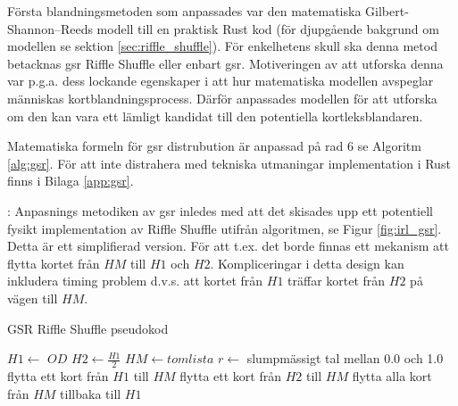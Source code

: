 \documentclass[swedish,a4paper]{article}
\begin{document}
Första blandningsmetoden som anpassades var den matematiska
Gilbert-Shannon–Reeds modell till en praktisk Rust kod (för djupgående bakgrund
om modellen se sektion \ref{sec:riffle_shuffle}). För enkelhetens skull ska denna metod
betacknas \gls{gsr} Riffle Shuffle eller enbart \gls{gsr}. Motiveringen av att
utforska denna var  p.g.a. dess lockande egenskaper i att hur matematiska
modellen avspeglar människas kortblandningsprocess. Därför anpassades modellen för att
utforska om den kan vara ett lämligt kandidat till den potentiella
kortleksblandaren.

Matematiska formeln för \gls{gsr} distrubution är anpassad på rad 6 se Algoritm
\ref{alg:gsr}. För att inte distrahera med tekniska utmaningar implementation i
Rust finns i Bilaga \ref{app:gsr}.

: Anpasnings metodiken av
\gls{gsr} inledes med att det skisades upp ett potentiell fysikt implementation av
Riffle Shuffle utifrån algoritmen, se Figur \ref{fig:irl_gsr}. Detta är ett
simplifierad version. För att t.ex. det borde finnas ett mekanism att flytta
kortet från $HM$ till $H1$ och $H2$. Kompliceringar i detta design kan inkludera
timing problem d.v.s. att kortet från $H1$ träffar kortet från $H2$ på vägen
till $HM$.

\begin{algorithm}
\caption{GSR Riffle Shuffle pseudokod}
\label{alg:gsr}
\begin{algorithmic}[1]
\State $H1 \gets$ $OD$ 
\State $H2 \gets \frac{H1}{2}$ 
\State $HM \gets tom lista$ 
\State $r \gets$ slumpmässigt tal mellan 0.0 och 1.0 
        \State flytta ett kort från $H1$ till $HM$
    \Else
        \State flytta ett kort från $H2$ till $HM$
    \EndIf
\EndWhile
\State flytta alla kort från $HM$ tillbaka till $H1$
\end{algorithmic}
\end{algorithm}

\clearpage %

\end{document}

